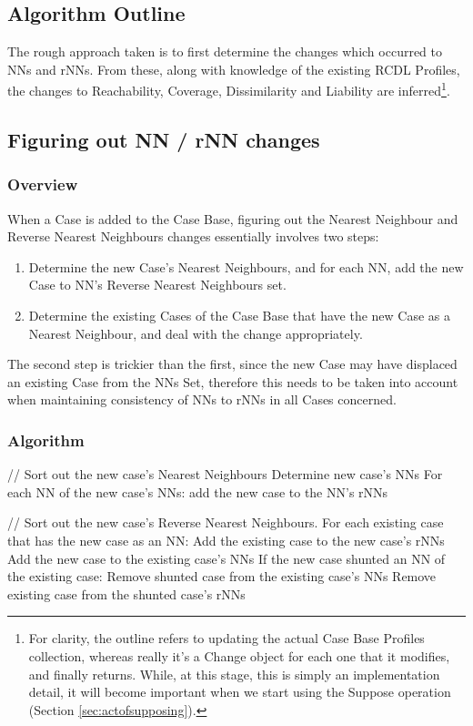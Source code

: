 \documentclass[a4paper,11pt]{report}
\begin{document}
\subsection{Algorithm Outline}
The rough approach taken is to first determine the changes which occurred to NNs and rNNs. From these, along with knowledge of the existing RCDL Profiles, the changes to Reachability, Coverage, Dissimilarity and Liability are inferred\footnote{For clarity, the outline refers to updating the actual Case Base Profiles collection, whereas really it's a Change object for each one that it modifies, and finally returns. While, at this stage, this is simply an implementation detail, it will become important when we start using the Suppose operation (Section \ref{sec:actofsupposing}).}.

\subsection{Figuring out NN / rNN changes}
\subsubsection{Overview}
When a Case is added to the Case Base, figuring out the Nearest Neighbour and Reverse Nearest Neighbours changes essentially involves two steps:
\begin{enumerate}
	\item Determine the new Case's Nearest Neighbours, and for each NN, add the new Case to NN's Reverse Nearest Neighbours set.
	\item Determine the existing Cases of the Case Base that have the new Case as a Nearest Neighbour, and deal with the change appropriately.
\end{enumerate}

The second step is trickier than the first, since the new Case may have displaced an existing Case from the NNs Set, therefore this needs to be taken into account when maintaining consistency of NNs to rNNs in all Cases concerned.

\subsubsection{Algorithm\label{sec:nnchangesalg}}
\begin{code}
// Sort out the new case's Nearest Neighbours
Determine new case's NNs
For each NN of the new case's NNs:
  add the new case to the NN's rNNs

// Sort out the new case's Reverse Nearest Neighbours.
For each existing case that has the new case as an NN:
  Add the existing case to the new case's rNNs
  Add the new case to the existing case's NNs
  If the new case shunted an NN of the existing case:
    Remove shunted case from the existing case's NNs
    Remove existing case from the shunted case's rNNs
\end{code}
\end{document}
